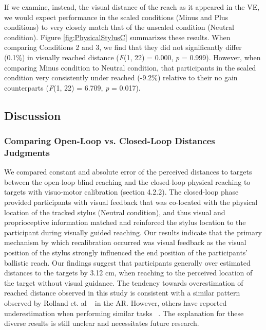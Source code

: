 If we examine, instead, the visual distance of the reach as it appeared in the VE, we would expect performance in the scaled conditions (Minus and Plus conditions) to very closely match that of the unscaled condition (Neutral condition). Figure \ref{fig:PhysicalStylusC} summarizes these results. When comparing Conditions 2 and 3, we find that they did not significantly differ (0.1\%) in visually reached distance (\textit{F}(1, 22) = 0.000, \textit{p} = 0.999). However, when comparing Minus condition to Neutral condition, that participants in the scaled condition very consistently under reached (-9.2\%) relative to their no gain counterparts (\textit{F}(1, 22) = 6.709, \textit{p} = 0.017).

\subsection{Discussion}
\subsubsection{Comparing Open-Loop vs. Closed-Loop Distances Judgments}
We compared constant and absolute error of the perceived distances to targets between the open-loop blind reaching and the closed-loop physical reaching to targets with visuo-motor calibration (section 4.2.2). The closed-loop phase provided participants with visual feedback that was co-located with the physical location of the tracked stylus (Neutral condition), and thus visual and proprioceptive information matched and reinforced the stylus location to the participant during visually guided reaching. Our results indicate that the primary mechanism by which recalibration occurred was visual feedback as the visual position of the stylus strongly influenced the end position of the participants' ballistic reach. Our findings suggest that participants generally over estimated distances to the targets by 3.12 cm, when reaching to the perceived location of the target without visual guidance. The tendency towards overestimation of reached distance observed in this study is consistent with a similar pattern observed by Rolland et. al ~\cite{RBG+95} in the AR. However, others have reported underestimation when performing similar tasks ~\cite{ANL+12,SSJ+10,NAB+11}. The explanation for these diverse results is still unclear and necessitates future research.

